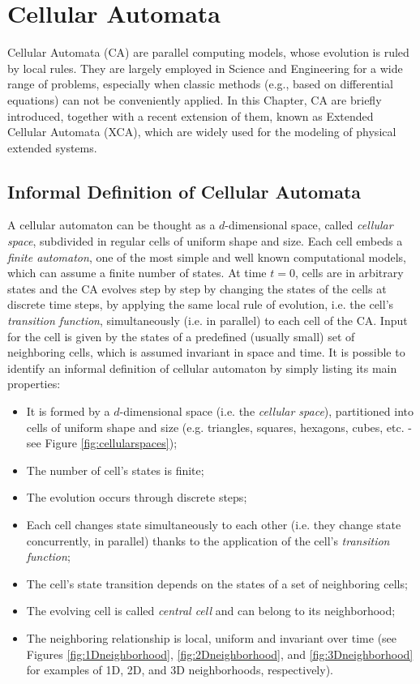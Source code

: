 \chapter{Cellular Automata}\label{ch:CA}

Cellular Automata (CA) are parallel computing models, whose evolution
is ruled by local rules. They are largely employed in Science and
Engineering for a wide range of problems, especially when classic
methods (e.g., based on differential equations) can not be conveniently
applied. In this Chapter, CA are briefly introduced, together with a
recent extension of them, known as Extended Cellular Automata (XCA),
which are widely used for the modeling of physical extended systems.


\section{Informal Definition of Cellular Automata}\label{sec:CAInformaDef}

A cellular automaton can be thought as a $d$-dimensional space, called
\emph{cellular space}, subdivided in regular cells of uniform shape
and size. Each cell embeds a \emph{finite automaton}, one of the most
simple and well known computational models, which can assume a finite
number of states. At time $t=0$, cells are in arbitrary states and the
CA evolves step by step by changing the states of the cells at
discrete time steps, by applying the same local rule of evolution,
i.e. the cell's \emph{transition function}, simultaneously (i.e. in
parallel) to each cell of the CA. Input for the cell is given by the
states of a predefined (usually small) set of neighboring cells, which
is assumed invariant in space and time. It is possible to identify an
informal definition of cellular automaton by simply listing its main
properties:

\begin{itemize}
\item It is formed by a $d$-dimensional space (i.e. the \emph{cellular
  space}), partitioned into cells of uniform shape and size
  (e.g. triangles, squares, hexagons, cubes, etc. - see Figure
  \ref{fig:cellularspaces});
\item The number of cell's states is finite;
\item The evolution occurs through discrete steps;
\item Each cell changes state simultaneously to each other (i.e. they
  change state concurrently, in parallel) thanks to the application of
  the cell's \emph{transition function};
\item The cell's state transition depends on the states of a set of neighboring cells;
\item The evolving cell is called \emph{central cell} and can belong
  to its neighborhood;
\item The neighboring relationship is local, uniform and invariant
  over time (see Figures \ref{fig:1Dneighborhood},
  \ref{fig:2Dneighborhood}, and \ref{fig:3Dneighborhood} for examples
  of 1D, 2D, and 3D neighborhoods, respectively).
\end{itemize}


